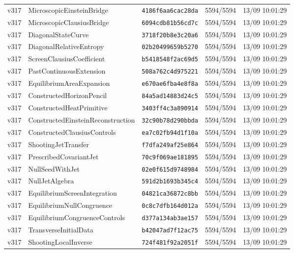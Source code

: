 \documentclass[11pt]{article}
\theoremstyle{definition}\newtheorem{deriv}{Derivation}
\begin{document}
{\begin{longtable}{@{}lllll@{}}
v317 & MicroscopicEinsteinBridge & \texttt{4186f6aa6cac28da} & 5594/5594 & 13/09 10:01:29 \\
v317 & MicroscopicClausiusBridge & \texttt{6094cdb81b56cd7c} & 5594/5594 & 13/09 10:01:29 \\
v317 & DiagonalStateCurve & \texttt{3718f20b8e3c20a6} & 5594/5594 & 13/09 10:01:29 \\
v317 & DiagonalRelativeEntropy & \texttt{02b20499659b5270} & 5594/5594 & 13/09 10:01:29 \\
v317 & ScreenClausiusCoefficient & \texttt{b5418548f2ac69d5} & 5594/5594 & 13/09 10:01:29 \\
v317 & PastContinuousExtension & \texttt{508a762c4d975221} & 5594/5594 & 13/09 10:01:29 \\
v317 & EquilibriumAreaExpansion & \texttt{e670ae6fba4e8f8a} & 5594/5594 & 13/09 10:01:29 \\
v317 & ConstructedHorizonPencil & \texttt{84a5ad14883d24c5} & 5594/5594 & 13/09 10:01:29 \\
v317 & ConstructedHeatPrimitive & \texttt{3403ff4c3a890914} & 5594/5594 & 13/09 10:01:29 \\
v317 & ConstructedEinsteinReconstruction & \texttt{32c90b78d290bbda} & 5594/5594 & 13/09 10:01:29 \\
v317 & ConstructedClausiusControls & \texttt{ea7c02fb94d1f10a} & 5594/5594 & 13/09 10:01:29 \\
v317 & ShootingJetTransfer & \texttt{f7dfa249af25e864} & 5594/5594 & 13/09 10:01:29 \\
v317 & PrescribedCovariantJet & \texttt{70c9f069ae181895} & 5594/5594 & 13/09 10:01:29 \\
v317 & NullSeedWithJet & \texttt{02e0f615d9748984} & 5594/5594 & 13/09 10:01:29 \\
v317 & NullJetAlgebra & \texttt{591d2b1693b345c4} & 5594/5594 & 13/09 10:01:29 \\
v317 & EquilibriumScreenIntegration & \texttt{04821ca36872c8bb} & 5594/5594 & 13/09 10:01:29 \\
v317 & EquilibriumNullCongruence & \texttt{0c8c7dfb164d012a} & 5594/5594 & 13/09 10:01:29 \\
v317 & EquilibriumCongruenceControls & \texttt{d377a134ab3ae157} & 5594/5594 & 13/09 10:01:29 \\
v317 & TransverseInitialData & \texttt{b42047ad7f12ac75} & 5594/5594 & 13/09 10:01:29 \\
v317 & ShootingLocalInverse & \texttt{724f481f92a2051f} & 5594/5594 & 13/09 10:01:29 \\

\end{longtable}}
\end{document}
